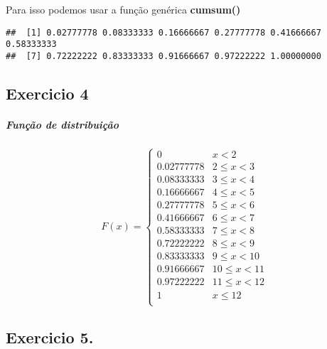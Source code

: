\documentclass[
]{article}
\newenvironment{Shaded}{\begin{snugshade}}{\end{snugshade}}
\newcommand{\FunctionTok}[1]{\textcolor[rgb]{0.00,0.00,0.00}{#1}}
\newcommand{\NormalTok}[1]{#1}
\newcommand{\OtherTok}[1]{\textcolor[rgb]{0.56,0.35,0.01}{#1}}
\newcommand{\SpecialCharTok}[1]{\textcolor[rgb]{0.00,0.00,0.00}{#1}}
\begin{document}
Para isso podemos usar a função genérica \textbf{cumsum()}

\begin{Shaded}
\end{Shaded}

\begin{verbatim}
##  [1] 0.02777778 0.08333333 0.16666667 0.27777778 0.41666667 0.58333333
##  [7] 0.72222222 0.83333333 0.91666667 0.97222222 1.00000000
\end{verbatim}

\hypertarget{exercicio-4}{%
\subsection{Exercicio 4}\label{exercicio-4}}

\hypertarget{funuxe7uxe3o-de-distribuiuxe7uxe3o}{%
\subparagraph{Função de
distribuição}\label{funuxe7uxe3o-de-distribuiuxe7uxe3o}}

\[ F(x)=   \left \{
            \begin{array}{ll}
                  0  & x < 2 \\
                  0.02777778  & 2 \le x < 3 \\
                  0.08333333 & 3 \le x < 4 \\
                  0.16666667 & 4 \le x < 5 \\
                  0.27777778  & 5 \le x < 6 \\
                  0.41666667 & 6 \le x < 7 \\
                  0.58333333 & 7 \le x < 8 \\
                  0.72222222  & 8 \le x < 9 \\
                  0.83333333 & 9 \le x < 10 \\
                  0.91666667 & 10 \le x < 11 \\
                  0.97222222 & 11 \le x < 12 \\
                  1 & x \le 12 \\
\end{array} 
\right.  \]

\hypertarget{exercicio-5.}{%
\subsection{Exercicio 5.}\label{exercicio-5.}}
\end{document}

